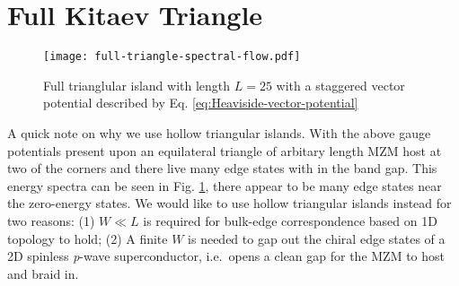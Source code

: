 \section{Full Kitaev Triangle}

\begin{figure}[here]
  \texttt{[image: full-triangle-spectral-flow.pdf]}
  \caption{Full trianglular island with length $L=25$ with a staggered vector potential described by Eq. \ref{eq:Heaviside-vector-potential}}
  \label{fig:full-triangle-energy}
\end{figure}


A quick note on why we use hollow triangular islands.
With the above gauge potentials present upon an equilateral triangle of arbitary length MZM host at two of the corners and there live many edge states with in the band gap.
This energy spectra can be seen in Fig. \ref{fig:full-triangle-energy}, there appear to be many edge states near the zero-energy states.
We would like to use hollow triangular islands instead for two reasons: (1) $W \ll L$ is required for bulk-edge correspondence based on 1D topology to hold; (2) A finite $W$ is needed to gap out the chiral edge states of a 2D spinless \textit{p}-wave superconductor, i.e.\ opens a clean gap for the MZM to host and braid in.


